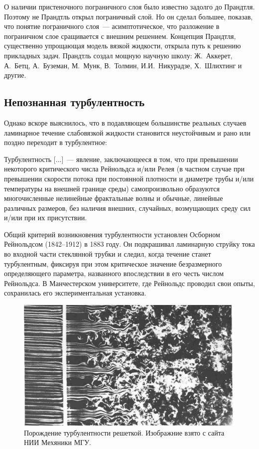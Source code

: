 О наличии пристеночного пограничного слоя было известно задолго до Прандтля. Поэтому не Прандтль открыл 
пограничный слой. Но он сделал большее, показав, что понятие пограничного слоя~--- асимптотическое, что 
разложение в пограничном слое сращивается с внешним решением. Концепция Прандтля, существенно упрощающая 
модель вязкой жидкости, открыла путь к решению прикладных задач. Прандтль создал мощную научную школу: 
Ж.~Аккерет, А.~Бетц, А.~Буземан, М.~Мунк, В.~Толмин, И.И.~Никурадзе, Х.~Шлихтинг и другие.

\subsection{Непознанная турбулентность}

Однако вскоре выяснилось, что в подавляющем большинстве реальных случаев ламинарное течение слабовязкой жидкости 
становится неустойчивым и рано или поздно переходит в турбулентное:

Турбулентность [...]~--- явление, заключающееся в том, что при превышении некоторого критического числа 
Рейнольдса и/или Релея (в частном случае при превышении скорости потока при постоянной плотности и диаметре
трубы и/или температуры на внешней границе среды) самопроизвольно образуются многочисленные нелинейные 
фрактальные волны и обычные, линейные различных размеров, без наличия внешних, случайных, возмущающих 
среду сил и/или при их присутствии.

Общий критерий возникновения турбулентности установлен Осборном Рейнольдсом (1842--1912) в 1883 году. 
Он подкрашивал ламинарную струйку тока во входной части стеклянной трубки и следил, когда течение станет 
турбулентным, фиксируя при этом критическое значение безразмерного определяющего параметра, названного 
впоследствии в его честь числом Рейнольдса. В Манчестерском университете, где Рейнольдс проводил свои опыты, 
сохранилась его экспериментальная установка.

\begin{figure}[htp]
\centering
\includegraphics[width=0.7\linewidth]{historyImg/turb.pdf}
\caption{Порождение турбулентности решеткой. Изображние взято с сайта НИИ Мехяники МГУ.}
\label{img:turb}
\end{figure}

